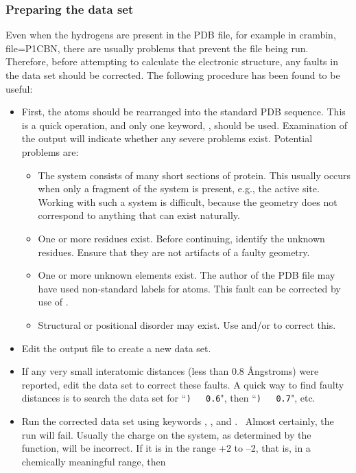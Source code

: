 \subsubsection{Preparing the data set}
Even when the hydrogens are present in the PDB file, for example in
crambin, file=P1CBN, there
are usually problems that prevent the file being run.  Therefore, before attempting
to calculate the electronic structure, any faults in the data set should be
corrected.  The following procedure has been found to be useful:
\begin{itemize}
\item First, the atoms should be rearranged into the standard PDB sequence.
This is a quick operation, and only one keyword, , should be used.
Examination of the output will indicate whether any severe problems exist.
Potential problems are:
\begin{itemize}
\item The system consists of many short sections of protein.  This usually
occurs when only a fragment of the system is present, e.g., the active site.
Working with such a system is difficult, because the geometry does not
correspond to anything that can exist naturally.
\item One or more  residues exist.  Before continuing, identify the
unknown residues.  Ensure that they are not artifacts of a faulty geometry.
\item One or more unknown elements exist.  The author of the PDB file may
have used non-standard labels for atoms.  This fault can be corrected by
use of .
\item Structural or positional disorder may exist.  Use  and/or
 to correct this.
\end{itemize}
\item Edit the output file to create a new data set.
\item If any very small interatomic distances (less than 0.8 \AA ngstroms) were
reported, edit the data set to correct these faults.  A quick way to find
faulty distances is to search the data set for ``\verb+)   0.6+", then
``\verb+)   0.7+", etc.
\item Run the corrected data set using keywords , ,
and . \ Almost certainly, the run will fail.  Usually the charge on the
system, as determined by the  function, will be incorrect.  If it
is in the range +2 to --2, that is, in a chemically meaningful range, then

\end{itemize}
